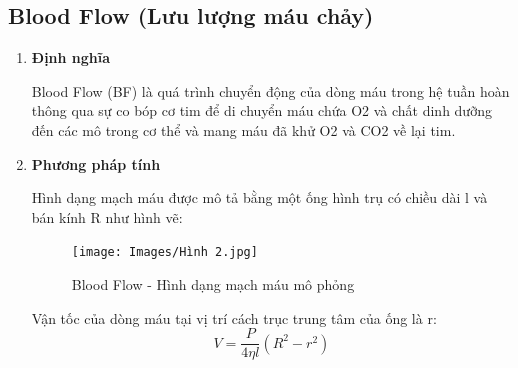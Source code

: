 \documentclass[12pt,a4paper]{article}
\begin{document}
\subsection{Blood Flow (Lưu lượng máu chảy)}
\begin{enumerate} [a/]
	\item \textbf{Định nghĩa}
	      \begin{flushleft}
		      Blood Flow (BF) là quá trình chuyển động của dòng máu trong hệ tuần hoàn thông qua sự co bóp cơ tim để di chuyển máu chứa O2 và chất dinh dưỡng đến các mô trong cơ thể và mang máu đã khử O2 và CO2 về lại tim.
	      \end{flushleft}
	\item \textbf{Phương pháp tính }
	      \begin{flushleft}
		      Hình dạng mạch máu được mô tả bằng một ống hình trụ có chiều dài l và bán kính R như hình vẽ:\\
		      \begin{figure} [ht]
			      \centering
			      \texttt{[image: Images/Hình 2.jpg]}
			      \caption{Blood Flow - Hình dạng mạch máu mô phỏng}
			      \label{enter-label}
		      \end{figure}
		      Vận tốc của dòng máu tại vị trí cách trục trung tâm của ống là r: $$V=\frac{P}{4\eta l}(R^2-r^2)$$ \\


\end{flushleft}
\end{enumerate}
\end{document}
